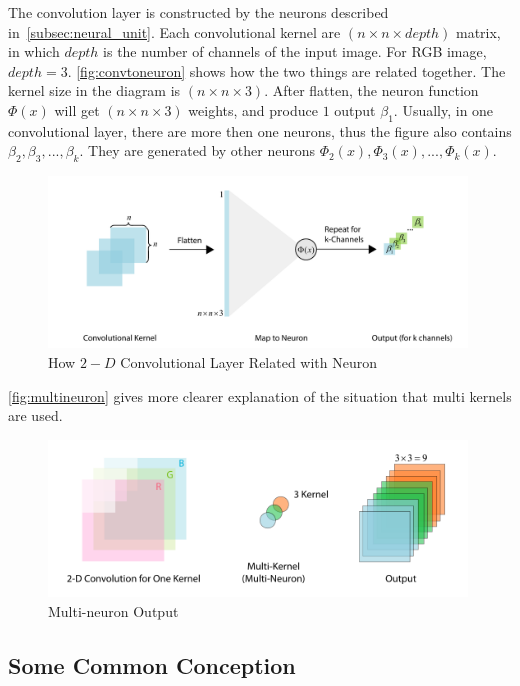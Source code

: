 \begin{spacing}{1.5}
The convolution layer is constructed by the neurons described in~\autoref{subsec:neural_unit}. Each convolutional kernel are $(n \times n \times depth)$ matrix, in which $depth$ is the number of channels of the input image. For RGB image, $depth = 3$. \autoref{fig:convtoneuron} shows how the two things are related together. The kernel size in the diagram is $(n \times n \times 3)$. After flatten, the neuron function $\Phi(x)$ will get $(n \times n \times 3)$ weights, and produce $1$ output $\beta_1$. Usually, in one convolutional layer, there are more then one neurons, thus the figure also contains $\beta_2, \beta_3, ..., \beta_k$. They are generated by other neurons $\Phi_2(x), \Phi_3(x), ..., \Phi_k(x)$.

\begin{figure}[ht]
\centering
\includegraphics[width=0.99\textwidth, fbox]{Chapter2/convtoneuron.pdf}
\caption{How $2-D$ Convolutional Layer Related with Neuron}
\label{fig:convtoneuron} 
\end{figure}

\autoref{fig:multineuron} gives more clearer explanation of the situation that multi kernels are used.

\begin{figure}[ht]
\centering
\includegraphics[width=0.99\textwidth, fbox]{Chapter2/multineuron.pdf}
\caption{Multi-neuron Output}
\label{fig:multineuron} 
\end{figure}

\subsection{Some Common Conception}


\end{spacing}
